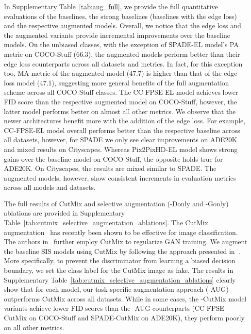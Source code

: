 \documentclass[final]{cvpr}
\newcommand\+{\mkern4mu}
\begin{document}
In Supplementary Table~\ref{tab:aug_full}, we provide the full quantitative evaluations of the baselines, the strong baselines (baselines with the edge loss) and the respective augmented models. Overall, we notice that the edge loss and the augmented variants provide incremental improvements over the baseline models. On the unbiased classes, with the exception of SPADE-EL model's PA metric on COCO-Stuff (66.3), the augmented models perform better than their edge loss counterparts across all datasets and metrics. In fact, for this exception too, MA metric of the augmented model (47.7) is higher than that of the edge loss model (47.1), suggesting more general benefits of the full augmentation scheme across all COCO-Stuff classes. The CC-FPSE-EL model achieves lower FID score than the respective augmented model on COCO-Stuff, however, the latter model performs better on almost all other metrics. We observe that the newer architectures benefit more with the addition of the edge loss. For example, CC-FPSE-EL model overall performs better than the respective baseline across all datasets, however, for SPADE we only see clear improvements on ADE20K and mixed results on Cityscapes. Whereas Pix2PixHD-EL model shows strong gains over the baseline model on COCO-Stuff, the opposite holds true for ADE20K. On Cityscapes, the results are mixed similar to SPADE. The augmented models, however, show consistent increments in evaluation metrics across all models and datasets. 

The full results of CutMix and selective augmentation (-Donly and -Gonly) ablations are provided in Supplementary Table~\ref{tab:cutmix_selective_augmentation_ablations}. The CutMix augmentation~\cite{yun2019cutmix} has recently been shown to be effective for image classification. The authors in~\cite{schonfeld2020u} further employ CutMix to regularize GAN training. We augment the baseline SIS models using CutMix by following the approach presented in~\cite{schonfeld2020u}. More specifically, to prevent the discriminator from learning a biased decision boundary, we set the class label for the CutMix image as fake. The results in Supplementary Table~\ref{tab:cutmix_selective_augmentation_ablations} clearly show that for each model, our task-specific augmentation approach (-AUG) outperforms CutMix across all datasets. While in some cases, the -CutMix model variants achieve lower FID scores than the -AUG counterparts (CC-FPSE-CutMix on COCO-Stuff and SPADE-CutMix on ADE20K), they perform poorly on all other metrics.
\end{document}
